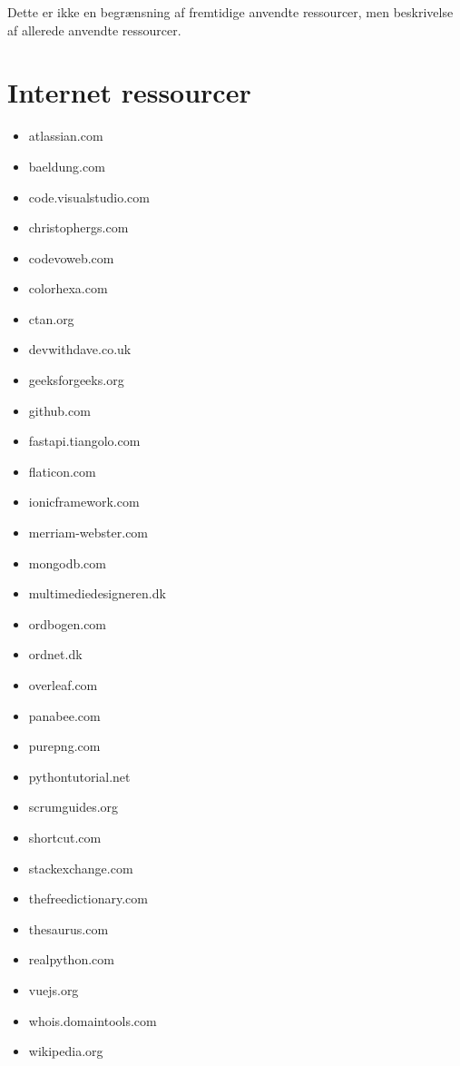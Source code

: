 \documentclass{report}
\begin{document}
Dette er ikke en begrænsning af fremtidige anvendte ressourcer, men beskrivelse af allerede anvendte ressourcer.

\section{Internet ressourcer}
\begin{itemize}
\item atlassian.com
\item baeldung.com
\item code.visualstudio.com
\item christophergs.com
\item codevoweb.com
\item colorhexa.com
\item ctan.org
\item devwithdave.co.uk
\item geeksforgeeks.org
\item github.com
\item fastapi.tiangolo.com
\item flaticon.com
\item ionicframework.com
\item merriam-webster.com
\item mongodb.com
\item multimediedesigneren.dk
\item ordbogen.com
\item ordnet.dk
\item overleaf.com
\item panabee.com
\item purepng.com
\item pythontutorial.net
\item scrumguides.org
\item shortcut.com
\item stackexchange.com
\item thefreedictionary.com
\item thesaurus.com
\item realpython.com
\item vuejs.org
\item whois.domaintools.com
\item wikipedia.org
\end{itemize}

	
\end{document}
